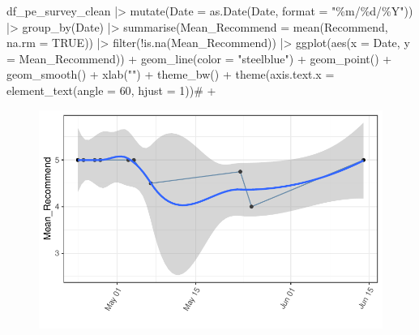 \documentclass[
  letterpaper,
  DIV=11,
  numbers=noendperiod]{scrartcl}
\newenvironment{Shaded}{\begin{snugshade}}{\end{snugshade}}
\newcommand{\AttributeTok}[1]{\textcolor[rgb]{0.40,0.45,0.13}{#1}}
\newcommand{\CommentTok}[1]{\textcolor[rgb]{0.37,0.37,0.37}{#1}}
\newcommand{\ConstantTok}[1]{\textcolor[rgb]{0.56,0.35,0.01}{#1}}
\newcommand{\DecValTok}[1]{\textcolor[rgb]{0.68,0.00,0.00}{#1}}
\newcommand{\FunctionTok}[1]{\textcolor[rgb]{0.28,0.35,0.67}{#1}}
\newcommand{\NormalTok}[1]{\textcolor[rgb]{0.00,0.23,0.31}{#1}}
\newcommand{\SpecialCharTok}[1]{\textcolor[rgb]{0.37,0.37,0.37}{#1}}
\newcommand{\StringTok}[1]{\textcolor[rgb]{0.13,0.47,0.30}{#1}}
\begin{document}
\begin{Shaded}
\begin{Highlighting}[]
\NormalTok{df\_pe\_survey\_clean }\SpecialCharTok{|\textgreater{}}
  \FunctionTok{mutate}\NormalTok{(}\AttributeTok{Date =} \FunctionTok{as.Date}\NormalTok{(Date, }\AttributeTok{format =} \StringTok{"\%m/\%d/\%Y"}\NormalTok{)) }\SpecialCharTok{|\textgreater{}}
  \FunctionTok{group\_by}\NormalTok{(Date) }\SpecialCharTok{|\textgreater{}}
  \FunctionTok{summarise}\NormalTok{(}\AttributeTok{Mean\_Recommend =} \FunctionTok{mean}\NormalTok{(Recommend, }\AttributeTok{na.rm =} \ConstantTok{TRUE}\NormalTok{)) }\SpecialCharTok{|\textgreater{}}
  \FunctionTok{filter}\NormalTok{(}\SpecialCharTok{!}\FunctionTok{is.na}\NormalTok{(Mean\_Recommend)) }\SpecialCharTok{|\textgreater{}} 
  \FunctionTok{ggplot}\NormalTok{(}\FunctionTok{aes}\NormalTok{(}\AttributeTok{x =}\NormalTok{ Date, }\AttributeTok{y =}\NormalTok{ Mean\_Recommend)) }\SpecialCharTok{+}
  \FunctionTok{geom\_line}\NormalTok{(}\AttributeTok{color =} \StringTok{"steelblue"}\NormalTok{) }\SpecialCharTok{+}
  \FunctionTok{geom\_point}\NormalTok{() }\SpecialCharTok{+}
  \FunctionTok{geom\_smooth}\NormalTok{() }\SpecialCharTok{+}
  \FunctionTok{xlab}\NormalTok{(}\StringTok{""}\NormalTok{) }\SpecialCharTok{+}
  \FunctionTok{theme\_bw}\NormalTok{() }\SpecialCharTok{+}
  \FunctionTok{theme}\NormalTok{(}\AttributeTok{axis.text.x =} \FunctionTok{element\_text}\NormalTok{(}\AttributeTok{angle =} \DecValTok{60}\NormalTok{, }\AttributeTok{hjust =} \DecValTok{1}\NormalTok{))}\CommentTok{\# +}
\end{Highlighting}
\end{Shaded}

\begin{figure}[H]

{\centering \includegraphics{ytp_post_event_survey_files/figure-pdf/unnamed-chunk-20-1.pdf}

}

\end{figure}
\end{document}
